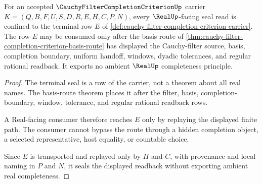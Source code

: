 \begin{theorem}
\label{thm:cauchy-filter-completion-criterion-real-seal-nonescape}
For an accepted $\CauchyFilterCompletionCriterionUp$ carrier
$K=(Q,B,F,U,S,D,R,E,H,C,P,N)$, every $\RealUp$-facing seal read is confined to
the terminal row $E$ of
\autoref{def:cauchy-filter-completion-criterion-carrier}. The row $E$ may be
consumed only after the basis route of
\autoref{thm:cauchy-filter-completion-criterion-basis-route} has displayed
the Cauchy-filter source, basis, completion boundary, uniform handoff,
windows, dyadic tolerances, and regular rational readback. It exports no
ambient $\RealUp$ completeness principle.
\end{theorem}
\begin{proof}
The terminal seal is a row of the carrier, not a theorem about all real
names. The basis-route theorem places it after the filter, basis,
completion-boundary, window, tolerance, and regular rational readback rows.

A Real-facing consumer therefore reaches $E$ only by replaying the displayed
finite path. The consumer cannot bypass the route through a hidden completion
object, a selected representative, host equality, or countable choice.

Since $E$ is transported and replayed only by $H$ and $C$, with provenance and
local naming in $P$ and $N$, it seals the displayed readback without exporting
ambient real completeness.
\end{proof}



